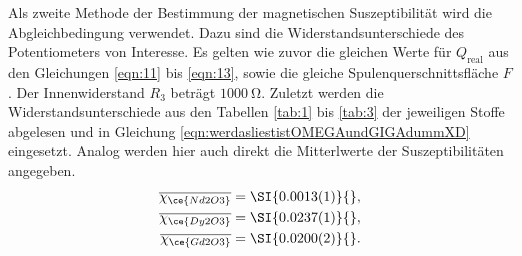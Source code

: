 Als zweite Methode der Bestimmung der magnetischen Suszeptibilität wird die Abgleichbedingung verwendet. Dazu sind die Widerstandsunterschiede des Potentiometers von Interesse.
Es gelten wie zuvor die gleichen Werte für $Q_{\text{real}}$ aus den Gleichungen \eqref{eqn:11} bis \eqref{eqn:13}, sowie die gleiche Spulenquerschnittsfläche $F$. Der Innenwiderstand $R_{3}$ beträgt $\SI{1000}{\ohm}$.
Zuletzt werden die Widerstandsunterschiede aus den Tabellen \ref{tab:1} bis \ref{tab:3} der jeweiligen Stoffe abgelesen und in Gleichung \eqref{eqn:werdasliestistOMEGAundGIGAdummXD} eingesetzt.
Analog werden hier auch direkt die Mitterlwerte der Suszeptibilitäten angegeben.
\begin{align}
    \overline{\chi_{\ce{Nd2O3}}} &= \SI{0.0013(1)}{},\\
    \overline{\chi_{\ce{Dy2O3}}} &= \SI{0.0237(1)}{},\\
    \overline{\chi_{\ce{Gd2O3}}} &= \SI{0.0200(2)}{}.
\end{align}